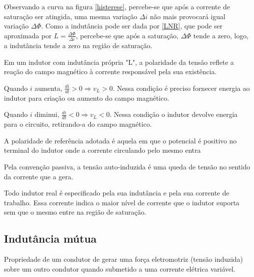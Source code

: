 \documentclass[12pt,fleqn]{book} %
\begin{document}
{Observando a curva na figura \ref{histerese}, percebe-se que após a corrente de saturação ser atingida, uma mesma variação $\Delta i$ não mais provocará igual variação $\Delta\Phi$. Como a indutância pode ser dada por \ref{LNR}, que pode ser aproximada por $L = \frac{\Delta\Phi}{\Delta i}$, percebe-se que após a saturação, $\Delta\Phi$ tende a zero, logo, a indutância tende a zero na região de saturação.

Em um indutor com indutância própria "L", a polaridade da tensão reflete a reação do campo magnético à corrente responsável pela sua existência.

\begin{remark}
Quando $i$ aumenta, $\frac{di}{dt} > 0 \Rightarrow v_L > 0$. Nessa condição é preciso fornecer energia ao indutor para criação ou aumento do campo magnético.
\end{remark}

\begin{remark}
Quando $i$ diminui, $\frac{di}{dt} < 0 \Rightarrow v_L < 0$. Nessa condição o indutor devolve energia para o circuito, retirando-a do campo magnético.
\end{remark}

\begin{remark}
A polaridade de referência adotada é aquela em que o potencial é positivo no terminal do indutor onde a corrente circulando pelo mesmo entra
\end{remark}


\begin{remark}
Pela convenção passiva, a tensão auto-induzida é uma queda de tensão no sentido da corrente que a gera.
\end{remark}


\begin{remark}
Todo indutor real é especificado pela sua indutância e pela sua corrente de trabalho. Essa corrente indica o maior nível de corrente que o indutor suporta sem que o mesmo entre na região de saturação.
\end{remark}
    
    \subsection{Indutância mútua}
    
    \begin{definition}
Propriedade de um condutor de gerar uma força eletromotriz (tensão induzida) sobre um outro condutor quando submetido a uma corrente elétrica variável.
    \end{definition}
    
}
\end{document}
